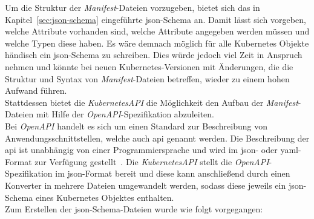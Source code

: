 Um die Struktur der \textit{Manifest}-Dateien vorzugeben, bietet sich das in Kapitel~\ref{sec:json-schema} eingeführte \acs{json}-Schema an.
Damit lässt sich vorgeben, welche Attribute vorhanden sind, welche Attribute angegeben werden müssen und welche Typen diese haben.
Es wäre demnach möglich für alle Kubernetes Objekte händisch ein \acs{json}-Schema zu schreiben. Dies würde jedoch viel Zeit in Anspruch nehmen und
könnte bei neuen Kubernetes-Versionen mit Änderungen, die die Struktur und Syntax von \textit{Manifest}-Dateien betreffen, wieder zu einem hohen Aufwand führen.
\\
Stattdessen bietet die \textit{KubernetesAPI} die Möglichkeit den Aufbau der \textit{Manifest}-Dateien mit Hilfe der \textit{OpenAPI}-Spezifikation abzuleiten.
\\
Bei \textit{OpenAPI} handelt es sich um einen Standard zur Beschreibung von Anwendungsschnittstellen, welche auch \ac{api} genannt werden. Die Beschreibung der \acs{api} ist
unabhängig von einer Programmiersprache und wird im \ac{json}- oder \ac{yaml}-Format zur Verfügung gestellt~\cite{openapi-org}.
Die \textit{KubernetesAPI} stellt die \textit{OpenAPI}-Spezifikation im \ac{json}-Format bereit und diese kann anschließend durch einen Konverter in
mehrere Dateien umgewandelt werden, sodass diese jeweils ein \acs{json}-Schema eines Kubernetes Objektes enthalten.
\\
Zum Erstellen der \acs{json}-Schema-Dateien wurde wie folgt vorgegangen:

